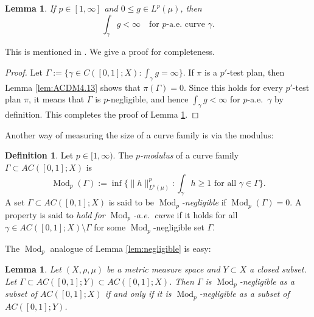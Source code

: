 \documentclass[11pt]{amsart}
\newtheorem{lemma}[theorem]{Lemma}
\theoremstyle{definition}
\newtheorem{definition}[theorem]{Definition}
\theoremstyle{remark}
\numberwithin{equation}{section}
\newcommand{\Norm}[2]{\|#1\|_{#2}}
\begin{document}
\begin{lemma}\label{lem:int-gamma-finite}
If $p\in[1,\infty]$ and $0\leq g\in L^p(\mu)$, then
\begin{equation*}
  \int_{\gamma}g<\infty\quad\text{for $p$-a.e.\ curve }\gamma.
\end{equation*}
\end{lemma}

This is mentioned in \cite[page 981]{AGS:13}. We give a proof for completeness.

\begin{proof}
Let $\Gamma:=\{\gamma\in C([0,1];X):\int_\gamma g=\infty\}$. If $\pi$ is a $p'$-test plan,
then Lemma \ref{lem:ACDM4.13} shows that $\pi(\Gamma)=0$. Since this holds for every
$p'$-test plan $\pi$, it means that
$\Gamma$ is $p$-negligible, and hence $\int_{\gamma}g<\infty$ for $p$-a.e.~$\gamma$ by
definition.
This completes the proof of Lemma \ref{lem:int-gamma-finite}.
\end{proof}

Another way of measuring the size of a curve family is via the modulus:

\begin{definition}
Let $p\in[1,\infty)$.
The {\em $p$-modulus} of a curve family $\Gamma\subset AC([0,1];X)$ is
\begin{equation*}
  \operatorname{Mod}_p(\Gamma)
  :=\inf\Big\{\Norm{h}{L^p(\mu)}^p:\int_\gamma h\geq 1\text{ for all }\gamma\in\Gamma\Big\}.
\end{equation*}
A set $\Gamma\subset AC([0,1];X)$ is said to be
\emph{$\operatorname{Mod}_p$-negligible} if $\operatorname{Mod}_p(\Gamma)=0$.
A property is said to \emph{hold for $\operatorname{Mod}_p$-a.e.\ curve} if it
holds for all $\gamma\in AC([0,1];X)\setminus\Gamma$ for some
$\operatorname{Mod}_p$-negligible set $\Gamma$.
\end{definition}

The $\operatorname{Mod}_p$ analogue of Lemma \ref{lem:negligible} is easy:

\begin{lemma}\label{lem:mod-negli}
Let $(X,\rho,\mu)$ be a metric measure space and $Y\subset X$ a closed subset.
Let $\Gamma\subset AC([0,1];Y)\subset AC([0,1];X)$.
Then $\Gamma$ is $\operatorname{Mod}_p$-negligible as a subset of $AC([0,1];X)$ if and only
if it is $\operatorname{Mod}_p$-negligible as a subset of $AC([0,1];Y)$.
\end{lemma}
\end{document}
